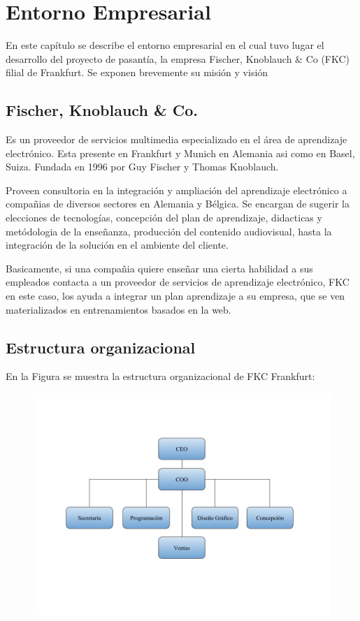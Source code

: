 \chapter{Entorno Empresarial}
\thispagestyle{empty} %

En este capítulo se describe el entorno empresarial en el cual tuvo lugar el desarrollo del proyecto de pasantía, la empresa Fischer, Knoblauch \& Co (FKC) filial de Frankfurt. Se exponen brevemente su misión y visión  

\section{Fischer, Knoblauch \& Co.}

Es un proveedor de servicios multimedia especializado en el área de aprendizaje electrónico. Esta presente en Frankfurt y Munich en Alemania asi como en Basel, Suiza. Fundada en 1996 por Guy Fischer y Thomas Knoblauch.

Proveen consultoria en la integración y ampliación del aprendizaje electrónico a compañias de diversos sectores en Alemania y Bélgica. Se encargan de sugerir la elecciones de tecnologías, concepción del plan de aprendizaje, didacticas y metódologia de la enseñanza, producción del contenido audiovisual, hasta la integración de la solución en el ambiente del cliente. 

Basicamente, si una compañia quiere enseñar una cierta habilidad a sus empleados contacta a un proveedor de servicios de aprendizaje electrónico, FKC en este caso, los ayuda a integrar un plan aprendizaje a su empresa, que se ven materializados en entrenamientos basados en la web. 



\section{Estructura organizacional}

En la Figura se muestra la estructura organizacional de FKC Frankfurt:

\begin{figure}[h]
\begin{center}
\includegraphics{figuras/estructuraFKC.jpg}
\end{center}
\end{figure}
